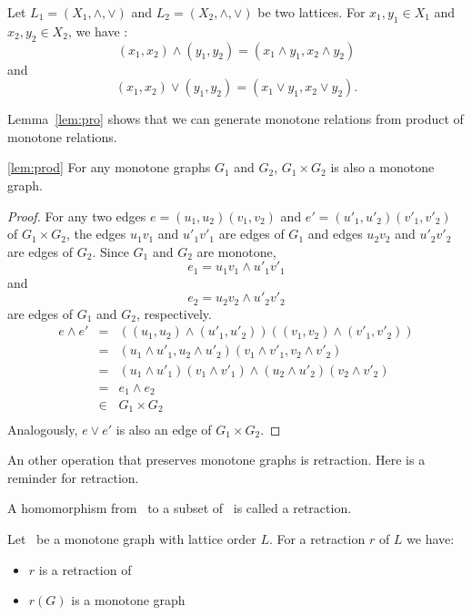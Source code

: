 \begin{rem}
Let \(L_1=(X_1,\wedge,\vee)\) and \(L_2=(X_2,\wedge,\vee)\) be two lattices.
For \(x_1,y_1 \in X_1\) and \(x_2,y_2\in X_2\), we have :
\[(x_1,x_2)\wedge (y_1,y_2) = (x_1\wedge y_1, x_2 \wedge y_2) \]
and \[(x_1,x_2)\vee (y_1,y_2) = (x_1\vee y_1, x_2 \vee y_2).\]
\end{rem}

Lemma~\ref{lem:pro} shows that we can generate monotone relations from product of monotone relations.

\begin{lemma}\ref{lem:prod}
For any monotone graphs \(G_1\) and \(G_2\), \(G_1 \times G_2\) is also a monotone graph.
\end{lemma}

\begin{proof}
For any two edges \(e = (u_1,u_2)(v_1,v_2)\) and \(e' =(u'_1,u'_2)(v'_1,v'_2)\) of \(G_1\times G_2\),
the edges \(u_1v_1\) and \(u'_1v'_1\) are edges of \(G_1\) and
edges \(u_2v_2\) and \(u'_2v'_2\) are edges of \(G_2\)\@.
Since \(G_1\) and \(G_2\) are monotone,
\[e_1 = u_1v_1 \wedge u'_1v'_1\]
and
\[e_2 = u_2v_2 \wedge u'_2v'_2\]
are edges of \(G_1\) and \(G_2\), respectively.
\begin{align*}
e \wedge e' &=& ((u_1,u_2)\wedge(u'_1,u'_2))((v_1,v_2)\wedge(v'_1,v'_2)) \\
&=& (u_1\wedge u'_1,u_2 \wedge u'_2)(v_1\wedge v'_1,v_2 \wedge v'_2) \\
&=& (u_1\wedge u'_1)(v_1\wedge v'_1) \wedge (u_2\wedge u'_2)(v_2\wedge v'_2) \\
&=& e_1 \wedge e_2 \\
&\in& G_1 \times G_2 \\
\end{align*}
Analogously, \(e \vee e'\) is also an edge of \(G_1\times G_2\)\@.
\end{proof}

An other operation that preserves monotone graphs is retraction. Here is a reminder 
for retraction.
\begin{defi} [Retraction]
A homomorphism from \mG\ to a subset of \mG\ is called a retraction.
\end{defi}

\begin{lemma}
Let \mG\ be a monotone graph with lattice order \(L\)\@. For a retraction \(r\) of \(L\)
we have:
\begin{itemize}
\item \(r\) is a retraction of \mG
\item \(r(G)\) is a monotone graph
\end{itemize}
\end{lemma}

